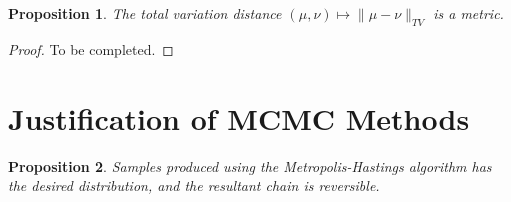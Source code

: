 \documentclass[a4paper,11pt]{article}
\newtheorem{proposition}{Proposition}
\begin{document}
\begin{proposition}
    The total variation distance $(\mu, \nu) \mapsto \|\mu - \nu\|_{TV}$ is a metric.
\end{proposition}

\begin{proof}
    To be completed.
\end{proof}


\section{Justification of MCMC Methods}

\begin{proposition}
    Samples produced using the Metropolis-Hastings algorithm has the desired distribution, and the resultant chain is reversible.
\end{proposition}
\end{document}
